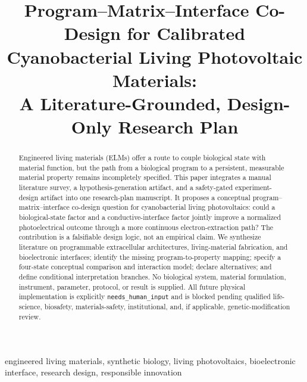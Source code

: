 \documentclass[conference]{IEEEtran}
\begin{document}
\title{Program--Matrix--Interface Co-Design for Calibrated Cyanobacterial Living Photovoltaic Materials:\\
A Literature-Grounded, Design-Only Research Plan}

\author{
}

\maketitle

\begin{abstract}
Engineered living materials (ELMs) offer a route to couple biological state with material function, but the path from a biological program to a persistent, measurable material property remains incompletely specified. This paper integrates a manual literature survey, a hypothesis-generation artifact, and a safety-gated experiment-design artifact into one research-plan manuscript. It proposes a conceptual program--matrix--interface co-design question for cyanobacterial living photovoltaics: could a biological-state factor and a conductive-interface factor jointly improve a normalized photoelectrical outcome through a more continuous electron-extraction path? The contribution is a falsifiable design logic, not an empirical claim. We synthesize literature on programmable extracellular architectures, living-material fabrication, and bioelectronic interfaces; identify the missing program-to-property mapping; specify a four-state conceptual comparison and interaction model; declare alternatives; and define conditional interpretation branches. No biological system, material formulation, instrument, parameter, protocol, or result is supplied. All future physical implementation is explicitly \texttt{needs\_human\_input} and is blocked pending qualified life-science, biosafety, materials-safety, institutional, and, if applicable, genetic-modification review.
\end{abstract}

\begin{IEEEkeywords}
engineered living materials, synthetic biology, living photovoltaics, bioelectronic interface, research design, responsible innovation
\end{IEEEkeywords}
\end{document}
